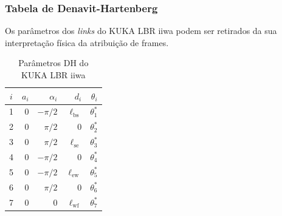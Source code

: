 \documentclass[aspectratio=169]{beamer}
\begin{document}
\begin{frame}
\frametitle{Tabela de Denavit-Hartenberg}
\begin{minipage}{0.58\textwidth}

Os parâmetros dos \textit{links} do KUKA LBR iiwa podem ser retirados da sua interpretação física da atribuição de frames.
\begin{table}[h]
    \centering
    \caption{Parâmetros DH do KUKA LBR iiwa}
    \label{tab:DH}
    \begin{tabular}{crrrr}
    \toprule
        $i$ & $a_i$ & $\alpha_i$ & $d_i$ & $\theta_i$ \\
    \midrule
        1 & 0 & $-\pi/2$ & $\ell_\mathrm{bs}$ & $\theta_1^*$ \\
        2 & 0 &  $\pi/2$ &                  0 & $\theta_2^*$ \\
        3 & 0 &  $\pi/2$ & $\ell_\mathrm{se}$ & $\theta_3^*$ \\
        4 & 0 & $-\pi/2$ &                  0 & $\theta_4^*$ \\
        5 & 0 & $-\pi/2$ & $\ell_\mathrm{ew}$ & $\theta_5^*$ \\
        6 & 0 &  $\pi/2$ &                  0 & $\theta_6^*$ \\
        7 & 0 &        0 & $\ell_\mathrm{wf}$ & $\theta_7^*$ \\
    \bottomrule
    \end{tabular}
    

\end{table}
\end{minipage}
\end{frame}
\end{document}
